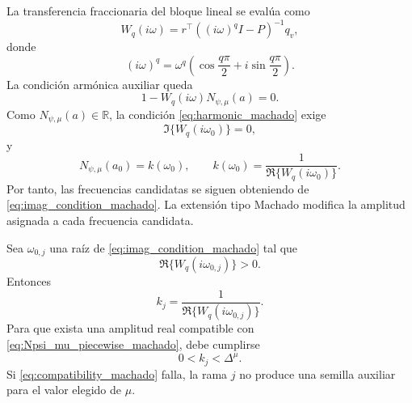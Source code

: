 \documentclass[journal]{IEEEtran}
\begin{document}
La transferencia fraccionaria del bloque lineal se evalúa como
\begin{equation}
\label{eq:Wq_machado_seed}
W_q(i\omega)
=
r^\top\left((i\omega)^qI-P\right)^{-1}q_v,
\end{equation}
donde
\begin{equation}
\label{eq:lambda_machado}
(i\omega)^q
=
\omega^q
\left(
\cos\frac{q\pi}{2}
+
i\sin\frac{q\pi}{2}
\right).
\end{equation}
La condición armónica auxiliar queda
\begin{equation}
\label{eq:harmonic_machado}
1-W_q(i\omega)N_{\psi,\mu}(a)=0.
\end{equation}
Como \(N_{\psi,\mu}(a)\in\mathbb R\), la condición
\eqref{eq:harmonic_machado} exige
\begin{equation}
\label{eq:imag_condition_machado}
\Im\{W_q(i\omega_0)\}=0,
\end{equation}
y
\begin{equation}
\label{eq:kmu_condition_machado}
N_{\psi,\mu}(a_0)
=
k(\omega_0),
\qquad
k(\omega_0)
=
\frac{1}{\Re\{W_q(i\omega_0)\}}.
\end{equation}
Por tanto, las frecuencias candidatas se siguen obteniendo de
\eqref{eq:imag_condition_machado}. La extensión tipo Machado modifica la
amplitud asignada a cada frecuencia candidata.

Sea \(\omega_{0,j}\) una raíz de \eqref{eq:imag_condition_machado} tal que
\[
\Re\{W_q(i\omega_{0,j})\}>0.
\]
Entonces
\begin{equation}
\label{eq:kj_machado}
k_j
=
\frac{1}{\Re\{W_q(i\omega_{0,j})\}}.
\end{equation}
Para que exista una amplitud real compatible con
\eqref{eq:Npsi_mu_piecewise_machado}, debe cumplirse
\begin{equation}
\label{eq:compatibility_machado}
0<k_j<\Delta^\mu.
\end{equation}
Si \eqref{eq:compatibility_machado} falla, la rama \(j\) no produce una
semilla auxiliar para el valor elegido de \(\mu\). 
\end{document}
